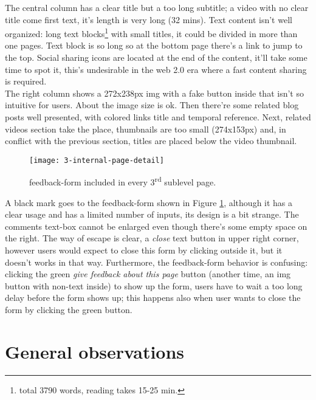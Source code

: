 \documentclass[
10pt, %
a4paper, %
oneside, %
headinclude,footinclude, %
BCOR5mm, %
]{scrartcl}
\begin{document}
	The central column has a clear title but a too long subtitle; a video with no clear title come first text, it's length is very long (32 mins). Text content isn't well organized: long text blocks\footnote{total 3790 words, reading takes 15-25 min.} with small titles, it could be divided in more than one pages. Text block is so long so at the bottom page there's a link to jump to the top. Social sharing icons are located at the end of the content, it'll take some time to spot it, this's undesirable in the web 2.0 era where a fast content sharing is required. \\
	The right column shows a 272x238px img with a fake button inside that isn't so intuitive for users. About the image size is ok. Then there're some related blog posts well presented, with colored links title and temporal reference. Next, related videos section take the place, thumbnails are too small (274x153px) and, in conflict with the previous section, titles are placed below the video thumbnail.
	
	\begin{figure}[h!]
	\centering 
	\centerline{\texttt{[image: 3-internal-page-detail]}}
	\caption[feedback-form]{feedback-form included in every 3\textsuperscript{rd} sublevel page.}
	\label{fig:terzapaginainternadettaglio} 
	\end{figure}

	A black mark goes to the feedback-form shown in Figure \ref{fig:terzapaginainternadettaglio}, although it has a clear usage and has a limited number of inputs, its design is a bit strange. The comments text-box cannot be enlarged even though there's some empty space on the right. The way of escape is clear, a \emph{close} text button in upper right corner, however users would expect to close this form by clicking outside it, but it doesn't works in that way. Furthermore, the feedback-form behavior is confusing: clicking the green \emph{give feedback about this page} button (another time, an img button with non-text inside) to show up the form, users have to wait a too long delay before the form shows up; this happens also when user wants to close the form by clicking the green button.


\newpage
\section{General observations}
\end{document}

